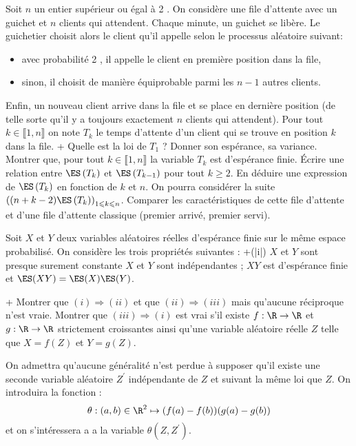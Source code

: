 \begin{exercise}
 Soit $n$ un entier supérieur ou égal à 2 . On considère une file d'attente avec un guichet et $n$ clients qui attendent. Chaque minute, un guichet se libère. Le guichetier choisit alors le client qu'il appelle selon le processus aléatoire suivant:
 \begin{itemize}
\item avec probabilité 2 , il appelle le client en première position dans la file,
\item sinon, il choisit de manière équiprobable parmi les $n-1$ autres clients.
\end{itemize}
Enfin, un nouveau client arrive dans la file et se place en dernière position (de telle sorte qu'il y a toujours exactement $n$ clients qui attendent). Pour tout $k \in \llbracket 1, n \rrbracket$ on note $T_{k}$ le temps d'attente d'un client qui se trouve en position $k$ dans la file.
\question+ Quelle est la loi de $T_{1}$ ? Donner son espérance, sa variance.
\question Montrer que, pour tout $k \in \llbracket 1, n \rrbracket$ la variable $T_{k}$ est d'espérance finie.
\question Écrire une relation entre $\ES\left(T_{k}\right)$ et $\ES\left(T_{k-1}\right)$ pour tout $k \geqslant 2$. En déduire une expression de $\ES\left(T_{k}\right)$ en fonction de $k$ et $n$. On pourra considérer la suite $\left((n+k-2) \ES\left(T_{k}\right)\right)_{1 \leqslant k \leqslant n} $.
\question Comparer les caractéristiques de cette file d'attente et d'une file d'attente \og classique \fg (premier arrivé, premier servi).
\endquestions 
\end{exercise}


\begin{exercise}[title=Cachan-Rennes 2015]
Soit $X$ et $Y$ deux variables aléatoires réelles d'espérance finie sur le même espace probabilisé. On considère les trois propriétés suivantes :
\question+(|i|)
$X$ et $Y$ sont presque surement constante
\question $X$ et $Y$ sont indépendantes ;
\question $X Y$ est d'espérance finie et $\ES(X Y)=\ES(X) \ES(Y)$.
\endquestions 

\question+ Montrer que $(i) \Rightarrow(ii)$ et que $(ii) \Rightarrow(iii)$ mais qu'aucune réciproque n'est vraie.
\question Montrer que $(i i i) \Rightarrow(i)$ est vrai s'il existe $f:\R \rightarrow \R$ et $g: \R \rightarrow\R$  strictement croissantes ainsi qu'une variable aléatoire réelle $Z$ telle que $X=f(Z)$ et $Y=g(Z)$.

On admettra qu'aucune généralité n'est perdue à supposer qu'il existe une seconde variable aléatoire $Z^{\prime}$ indépendante de $Z$ et suivant la même loi que $Z $. On introduira la fonction :
\begin{equation*}
\theta:(a, b) \in \R^{2} \mapsto(f(a)-f(b))(g(a)-g(b))
\end{equation*}
et on s'intéressera a a la variable $\theta\left(Z, Z^{\prime}\right)$.
\endquestions 
\end{exercise}

